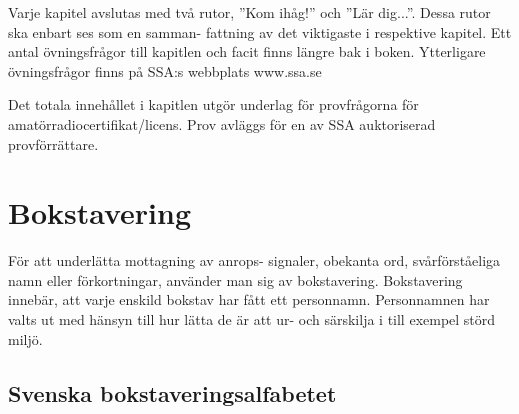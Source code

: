
Varje kapitel avslutas med två rutor, ”Kom ihåg!” och
”Lär dig...”. Dessa rutor ska enbart ses som en samman-
fattning av det viktigaste i respektive kapitel. Ett antal
övningsfrågor till kapitlen och facit finns längre
bak i boken. Ytterligare övningsfrågor finns på SSA:s
webbplats www.ssa.se

Det totala innehållet i kapitlen utgör underlag för
provfrågorna för amatörradiocertifikat/licens. Prov
avläggs för en av SSA auktoriserad provförrättare.

\section{Bokstavering}

För att underlätta mottagning av anrops-
signaler, obekanta ord, svårförståeliga namn
eller förkortningar, använder man sig av
bokstavering. Bokstavering innebär, att varje
enskild bokstav har fått ett personnamn.
Personnamnen har valts ut med hänsyn till
hur lätta de är att ur- och särskilja i till exempel
störd miljö.

\subsection{Svenska bokstaveringsalfabetet}


